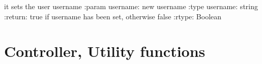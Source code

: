 \documentclass[letterpaper,10pt,english]{sphinxmanual}
\begin{document}
\begin{fulllineitems}
\begin{fulllineitems}
\end{fulllineitems}


\begin{fulllineitems}
\label{\detokenize{index:model.gio_db.User.set_username}}
it sets the user username
:param username: new username
:type username: string
:return: true if username has been set, otherwise false
:rtype: Boolean

\end{fulllineitems}


\end{fulllineitems}



\chapter{Controller, Utility functions}
\label{\detokenize{index:module-controller.utility}}\label{\detokenize{index:controller-utility-functions}}
\end{document}
